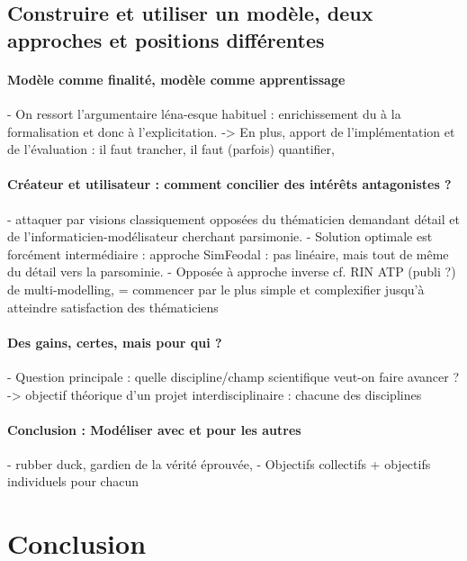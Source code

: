 \subsection{Construire et utiliser un modèle, deux approches et positions différentes}
\paragraph{Modèle comme finalité, modèle comme apprentissage}

- On ressort l'argumentaire léna-esque habituel : enrichissement du à la formalisation et donc à l'explicitation.
-> En plus, apport de l'implémentation et de l'évaluation : il faut trancher, il faut (parfois) quantifier, 

\paragraph{Créateur et utilisateur : comment concilier des intérêts antagonistes ?}

- attaquer par visions classiquement opposées du thématicien demandant détail et de l'informaticien-modélisateur cherchant parsimonie.
- Solution optimale est forcément intermédiaire : approche SimFeodal : pas linéaire, mais tout de même du détail vers la parsominie.
- Opposée à approche inverse cf. RIN ATP (publi ?) de multi-modelling, = commencer par le plus simple et complexifier jusqu'à atteindre satisfaction des thématiciens

\paragraph{Des gains, certes, mais pour qui ?}

- Question principale : quelle discipline/champ scientifique veut-on faire avancer ?
-> objectif théorique d'un projet interdisciplinaire : chacune des disciplines

\paragraph{Conclusion : Modéliser avec et pour les autres}
- rubber duck, \og gardien de la vérité éprouvée\fg{}, 
- Objectifs collectifs + objectifs individuels pour chacun

\section*{Conclusion}
